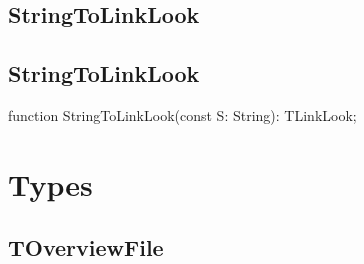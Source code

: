 \documentclass{report}
\newif\ifpdf
\begin{document}
\subsection*{\large{\textbf{StringToLinkLook}}\normalsize\hspace{1ex}\hrulefill}
\else
\subsection*{StringToLinkLook}
\fi
\label{PasDoc_Gen-StringToLinkLook}
\begin{list}{}{
\setlength{\itemindent}{0cm}
\setlength{\listparindent}{0cm}
\setlength{\leftmargin}{\evensidemargin}
\addtolength{\leftmargin}{\tmplength}
\settowidth{\labelsep}{X}
\addtolength{\leftmargin}{\labelsep}
\setlength{\labelwidth}{\tmplength}
}
\item[\textbf{Declaration}\hfill]
\ifpdf
\begin{flushleft}
\fi
\begin{ttfamily}
function StringToLinkLook(const S: String): TLinkLook;\end{ttfamily}

\ifpdf
\end{flushleft}
\fi

\end{list}
\section{Types}
\ifpdf
\subsection*{\large{\textbf{TOverviewFile}}\normalsize\hspace{1ex}\hrulefill}
\else
\end{document}
